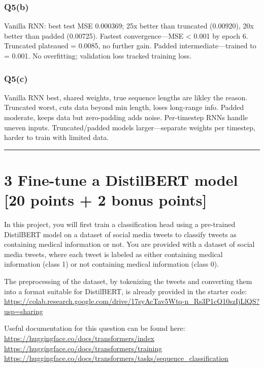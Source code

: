\documentclass[
  letterpaper,
  DIV=11,
  numbers=noendperiod]{scrartcl}
\begin{document}
\subsubsection{Q5(b)}\label{q5b}

Vanilla RNN: best test MSE 0.000369; 25x better than truncated
(0.00920), 20x better than padded (0.00725). Fastest convergence---MSE
\textless{} 0.001 by epoch 6. Truncated plateaued = 0.0085, no further
gain. Padded intermediate---trained to = 0.001. No overfitting;
validation loss tracked training loss.

\subsubsection{Q5(c)}\label{q5c}

Vanilla RNN best, shared weights, true sequence lengths are likley the
reason. Truncated worst, cuts data beyond min length, loses long-range
info. Padded moderate, keeps data but zero-padding adds noise.
Per-timestep RNNs handle uneven inputs. Truncated/padded models
larger---separate weights per timestep, harder to train with limited
data.

\begin{center}\rule{0.5\linewidth}{0.5pt}\end{center}

\section{3 Fine-tune a DistilBERT model {[}20 points + 2 bonus
points{]}}\label{fine-tune-a-distilbert-model-20-points-2-bonus-points}

In this project, you will first train a classification head using a
pre-trained DistilBERT model on a dataset of social media tweets to
classify tweets as containing medical information or not. You are
provided with a dataset of social media tweets, where each tweet is
labeled as either containing medical information (class 1) or not
containing medical information (class 0).

The preprocessing of the dataset, by tokenizing the tweets and
converting them into a format suitable for DistilBERT, is already
provided in the starter code:
\url{https://colab.research.google.com/drive/17syAcTav5Wtq-n_Rs3P1cQ10szIjLlQS?usp=sharing}

Useful documentation for this question can be found here:
\url{https://huggingface.co/docs/transformers/index}
\url{https://huggingface.co/docs/transformers/training}
\url{https://huggingface.co/docs/transformers/tasks/sequence_classification}
\end{document}
